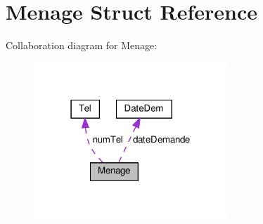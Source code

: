 \hypertarget{struct_menage}{}\section{Menage Struct Reference}
\label{struct_menage}


Collaboration diagram for Menage\+:
\nopagebreak
\begin{figure}[H]
\begin{center}
\leavevmode
\includegraphics[width=207pt]{struct_menage__coll__graph}
\end{center}
\end{figure}
